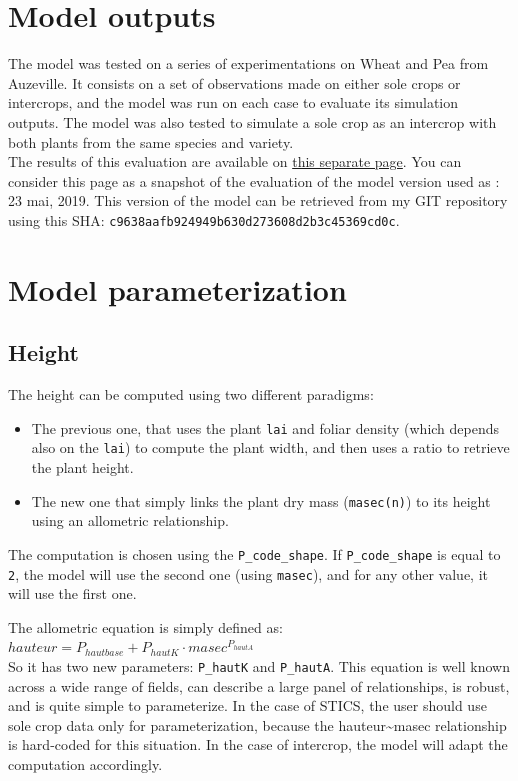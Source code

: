 \documentclass[]{book}
\providecommand{\tightlist}{%
  \setlength{\itemsep}{0pt}\setlength{\parskip}{0pt}}
\begin{document}
\hypertarget{model-outputs}{%
\section{Model outputs}\label{model-outputs}}

The model was tested on a series of experimentations on Wheat and Pea from Auzeville. It consists on a set of observations made on either sole crops or intercrops, and the model was run on each case to evaluate its simulation outputs. The model was also tested to simulate a sole crop as an intercrop with both plants from the same species and variety.\\
The results of this evaluation are available on \href{Auzeville_summary.html}{this separate page}.
You can consider this page as a snapshot of the evaluation of the model version used as : 23 mai, 2019. This version of the model can be retrieved from my GIT repository using this SHA: \texttt{c9638aafb924949b630d273608d2b3c45369cd0c}.

\hypertarget{model-parameterization}{%
\section{Model parameterization}\label{model-parameterization}}

\hypertarget{height-1}{%
\subsection{Height}\label{height-1}}

The height can be computed using two different paradigms:

\begin{itemize}
\tightlist
\item
  The previous one, that uses the plant \texttt{lai} and foliar density (which depends also on the \texttt{lai}) to compute the plant width, and then uses a ratio to retrieve the plant height.\\
\item
  The new one that simply links the plant dry mass (\texttt{masec(n)}) to its height using an allometric relationship.
\end{itemize}

The computation is chosen using the \texttt{P\_code\_shape}. If \texttt{P\_code\_shape} is equal to \texttt{2}, the model will use the second one (using \texttt{masec}), and for any other value, it will use the first one.

The allometric equation is simply defined as:\\
\(hauteur= P_{hautbase} + P_{hautK} \cdot masec^{P_{hautA}}\)\\
So it has two new parameters: \texttt{P\_hautK} and \texttt{P\_hautA}.
This equation is well known across a wide range of fields, can describe a large panel of relationships, is robust, and is quite simple to parameterize. In the case of STICS, the user should use sole crop data only for parameterization, because the hauteur\textasciitilde{}masec relationship is hard-coded for this situation. In the case of intercrop, the model will adapt the computation accordingly.
\end{document}
